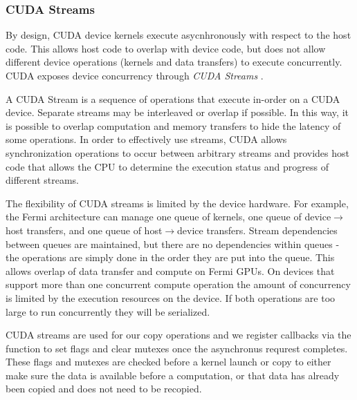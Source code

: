 
\subsubsection{CUDA Streams}
By design, CUDA device kernels execute asycnhronously with respect to the
host code. This allows host code to overlap with device code, but does not
allow different device operations (kernels and data transfers) to execute
concurrently. CUDA exposes device concurrency through \textit{CUDA Streams}
\cite{kirk2012programming}.

A CUDA Stream is a sequence of operations that
execute in-order on a CUDA device. Separate streams may be interleaved or
overlap if possible. In this way, it is possible to overlap computation and
memory transfers to hide the latency of some operations.
In order to effectively use streams, CUDA allows synchronization operations
to occur between arbitrary streams and provides host code that allows the
CPU to determine the execution status and progress of different streams.

The flexibility of CUDA streams is limited by the device hardware.
For example, the Fermi architecture can manage one queue of kernels, one queue
of device$\rightarrow$host transfers, and one queue of host$\rightarrow$device
transfers. Stream
dependencies between queues are maintained, but there are no dependencies
within queues - the operations are simply done in the order they are put into
the queue. This allows overlap of data transfer and compute on Fermi GPUs.
On devices that support more than one concurrent compute operation the amount
of concurrency is limited by the execution resources on the device. If both
operations are too large to run concurrently they will be serialized.


CUDA streams are used for our copy operations and we register callbacks via the  function to set flags and clear mutexes once
the asynchronus requrest completes.
These flags and mutexes are checked before a kernel launch or copy to either	make sure the data is available before a computation, or that data has
	already been copied and does not need to be recopied.

	